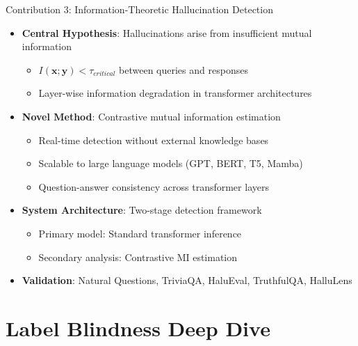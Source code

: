 \documentclass[aspectratio=169]{beamer}
\begin{document}
\begin{frame}{Contribution 3: Information-Theoretic Hallucination Detection}
\begin{itemize}
    \item \textbf{Central Hypothesis}: Hallucinations arise from insufficient mutual information
    \begin{itemize}
        \item $I(\mathbf{x}; \mathbf{y}) < \tau_{critical}$ between queries and responses
        \item Layer-wise information degradation in transformer architectures
    \end{itemize}
    \item \textbf{Novel Method}: Contrastive mutual information estimation
    \begin{itemize}
        \item Real-time detection without external knowledge bases
        \item Scalable to large language models (GPT, BERT, T5, Mamba)
        \item Question-answer consistency across transformer layers
    \end{itemize}
    \item \textbf{System Architecture}: Two-stage detection framework
    \begin{itemize}
        \item Primary model: Standard transformer inference
        \item Secondary analysis: Contrastive MI estimation
    \end{itemize}
    \item \textbf{Validation}: Natural Questions, TriviaQA, HaluEval, TruthfulQA, HalluLens
\end{itemize}
\end{frame}


\section{Label Blindness Deep Dive}
\end{document}
